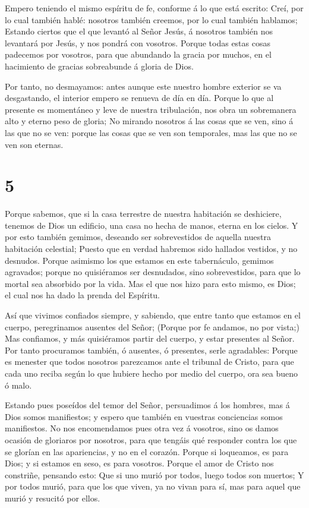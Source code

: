  Empero teniendo el mismo espíritu de fe, conforme á lo que
está escrito: Creí, por lo cual también hablé: nosotros también creemos,
por lo cual también hablamos;  Estando ciertos que el que
levantó al Señor Jesús, á nosotros también nos levantará por Jesús, y
nos pondrá con vosotros.  Porque todas estas cosas
padecemos por vosotros, para que abundando la gracia por muchos, en el
hacimiento de gracias sobreabunde á gloria de Dios.

 Por tanto, no desmayamos: antes aunque este nuestro hombre
exterior se va desgastando, el interior empero se renueva de día en día.
 Porque lo que al presente es momentáneo y leve de nuestra
tribulación, nos obra un sobremanera alto y eterno peso de gloria;
 No mirando nosotros á las cosas que se ven, sino á las que
no se ven: porque las cosas que se ven son temporales, mas las que no se
ven son eternas.

\hypertarget{section-4}{%
\section{5}\label{section-4}}

 Porque sabemos, que si la casa terrestre de nuestra
habitación se deshiciere, tenemos de Dios un edificio, una casa no hecha
de manos, eterna en los cielos.  Y por esto también gemimos,
deseando ser sobrevestidos de aquella nuestra habitación celestial;
 Puesto que en verdad habremos sido hallados vestidos, y no
desnudos.  Porque asimismo los que estamos en este
tabernáculo, gemimos agravados; porque no quisiéramos ser desnudados,
sino sobrevestidos, para que lo mortal sea absorbido por la vida.
 Mas el que nos hizo para esto mismo, es Dios; el cual nos
ha dado la prenda del Espíritu.

 Así que vivimos confiados siempre, y sabiendo, que entre
tanto que estamos en el cuerpo, peregrinamos ausentes del Señor;
 (Porque por fe andamos, no por vista;)  Mas
confiamos, y más quisiéramos partir del cuerpo, y estar presentes al
Señor.  Por tanto procuramos también, ó ausentes, ó
presentes, serle agradables:  Porque es menester que todos
nosotros parezcamos ante el tribunal de Cristo, para que cada uno reciba
según lo que hubiere hecho por medio del cuerpo, ora sea bueno ó malo.

 Estando pues poseídos del temor del Señor, persuadimos á
los hombres, mas á Dios somos manifiestos; y espero que también en
vuestras conciencias somos manifiestos.  No nos
encomendamos pues otra vez á vosotros, sino os damos ocasión de
gloriaros por nosotros, para que tengáis qué responder contra los que se
glorían en las apariencias, y no en el corazón.  Porque si
loqueamos, es para Dios; y si estamos en seso, es para vosotros.
 Porque el amor de Cristo nos constriñe, pensando esto: Que
si uno murió por todos, luego todos son muertos;  Y por
todos murió, para que los que viven, ya no vivan para sí, mas para aquel
que murió y resucitó por ellos.

